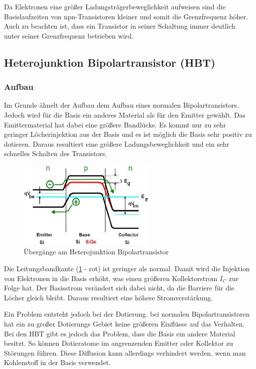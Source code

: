 	Da Elektronen eine größer Ladungsträgerbeweglichkeit aufweisen sind die Basislaufzeiten von npn-Transistoren kleiner und somit die Grenzfrequenz höher. Auch zu beachten ist, dass ein Transistor in seiner Schaltung immer deutlich unter seiner Grenzfrequenz betrieben wird.
\subsection{Heterojunktion Bipolartransistor (HBT)}
	\subsubsection{Aufbau}
	Im Grunde ähnelt der Aufbau dem Aufbau eines normalen Bipolartransistors. Jedoch wird für die Basis ein anderes Material als für den Emitter gewählt. Das Emittermaterial hat dabei eine größere Bandlücke. Es kommt nur zu sehr geringer Löcherinjektion aus der Basis und es ist möglich die Basis sehr positiv zu dotieren. Daraus resultiert eine größere Ladungsbeweglichkeit und ein sehr schnelles Schalten des Transistors.
	\begin{figure}[h]
		\centering
		\includegraphics[width=0.6\textwidth]{Kapitel/Kap10/hbt_uebergang.png}
		\caption{Übergänge am Heterojunktion Bipolartransistor}
		\label{10_hbt_uebergang}
	\end{figure}
	Die Leitungsbandkante (\ref{10_hbt_uebergang} - rot) ist geringer als normal. Damit wird die Injektion von Elektronen in die Basis erhöht, was einen größeren Kollektorstrom $I_C$ zur Folge hat. Der Basisstrom verändert sich dabei nicht, da die Barriere für die Löcher gleich bleibt. Daraus resultiert eine höhere Stromverstärkung. 
	
	Ein Problem entsteht jedoch bei der Dotierung. bei normalen Bipolartransistoren hat ein zu großer Dotierungs Gebiet keine größeren Einflüsse auf das Verhalten. Bei den HBT gibt es jedoch das Problem, dass die Basis ein andere Material besitzt. So können Dotieratome im angrenzenden Emitter oder Kollektor zu Störungen führen. Diese Diffusion kann allerdings verhindert werden, wenn man Kohlenstoff in der Basis verwendet. 
